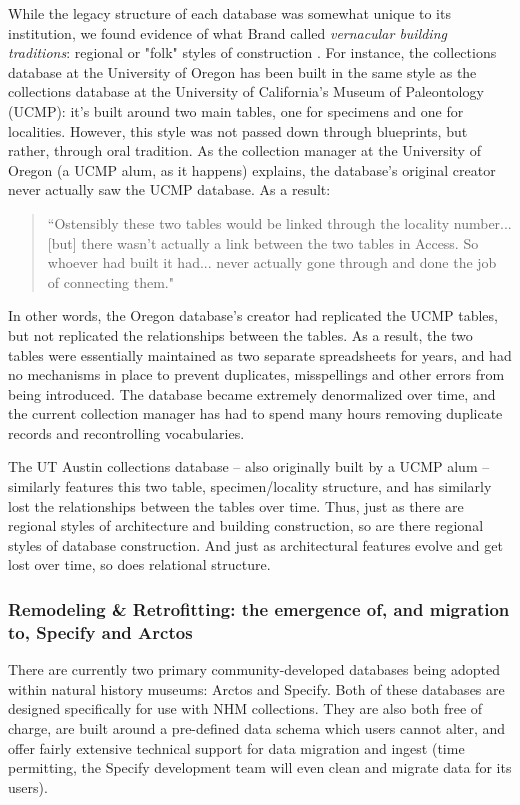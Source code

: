 While the legacy structure of each database was somewhat unique to its institution, we found evidence of what Brand called \textit{vernacular building traditions}: regional or "folk" styles of construction \cite{brand1995buildings}. For instance, the collections database at the University of Oregon has been built in the same style as the collections database at the University of California’s Museum of Paleontology (UCMP): it's built around two main tables, one for specimens and one for localities. However, this style was not passed down through blueprints, but rather, through oral tradition. As the collection manager at the University of Oregon (a UCMP alum, as it happens) explains, the database’s original creator never actually saw the UCMP database. As a result:
\begin{quote}
“Ostensibly these two tables would be linked through the locality number... [but] there wasn't actually a link between the two tables in Access. So whoever had built it had... never actually gone through and done the job of connecting them."
\end{quote}
In other words, the Oregon database's creator had replicated the UCMP tables, but not replicated the relationships between the tables. As a result, the two tables were essentially maintained as two separate spreadsheets for years, and had no mechanisms in place to prevent duplicates, misspellings and other errors from being introduced. The database became extremely denormalized over time, and the current collection manager has had to spend many hours removing duplicate records and recontrolling vocabularies.

The UT Austin collections database – also originally built by a UCMP alum – similarly features this two table, specimen/locality structure, and has similarly lost the relationships between the tables over time. Thus, just as there are regional styles of architecture and building construction, so are there regional styles of database construction. And just as architectural features evolve and get lost over time, so does relational structure.

\subsubsection{Remodeling \& Retrofitting: the emergence of, and migration to, Specify and Arctos}
There are currently two primary community-developed databases being adopted within natural history museums: Arctos and Specify. Both of these databases are designed specifically for use with NHM collections. They are also both free of charge, are built around a pre-defined data schema which users cannot alter, and offer fairly extensive technical support for data migration and ingest (time permitting, the Specify development team will even clean and migrate data for its users). 


